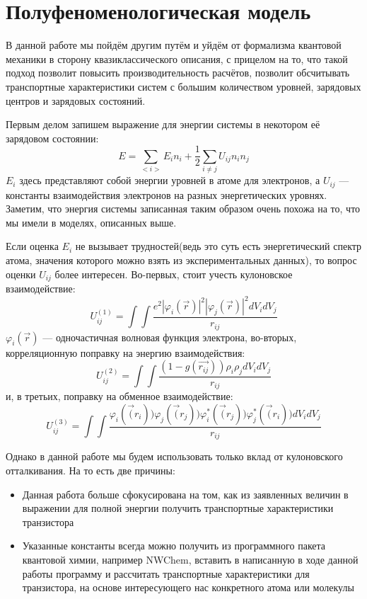 \documentclass[12pt,a4paper]{report}
\begin{document}
\section{Полуфеноменологическая модель}

В данной работе мы пойдём другим путём и уйдём от формализма квантовой механики в сторону квазиклассического описания, с прицелом на то, что такой подход позволит повысить производительность расчётов, позволит обсчитывать транспортные характеристики систем с большим количеством уровней, зарядовых центров и зарядовых состояний.

Первым делом запишем выражение для энергии системы в некотором её зарядовом состоянии:
\begin{equation}\label{phen}
E = \sum\limits_{<i>}E_i n_i + \frac{1}{2} \sum\limits_{i \neq j} U_{ij} n_i n_j
\end{equation}
$E_i$ здесь представляют собой энергии уровней в атоме для электронов, а $U_{ij}$ — константы взаимодействия электронов на разных энергетических уровнях. Заметим, что энергия системы записанная таким образом очень похожа на то, что мы имели в моделях, описанных выше.

Если оценка $E_i$ не вызывает трудностей(ведь это суть есть энергетический спектр атома, значения которого можно взять из экспериментальных данных), то вопрос оценки $U_{ij}$ более интересен. Во-первых, стоит учесть кулоновское взаимодействие:
\begin{equation}
U_{ij}^{(1)} = \int \int \frac{e^2 |\varphi_i(\vec{r})|^2 |\varphi_j(\vec{r})|^2 dV_i dV_j}{r_{ij}}
\end{equation}
$\varphi_i(\vec{r})$ — одночастичная волновая функция электрона, во-вторых, корреляционную поправку на энергию взаимодействия:
\begin{equation}
U_{ij}^{(2)} = \int \int \frac{(1 - g(\vec{r_{ij}})) \rho_i \rho_j dV_i dV_j}{r_{ij}}
\end{equation}
и, в третьих, поправку на обменное взаимодействие:
\begin{equation}
U_{ij}^{(3)} = \int \int \frac{\varphi_i(\vec(r_i)) \varphi_j(\vec(r_j)) \varphi_i^{*}(\vec(r_j))\varphi_j^*(\vec(r_i)) dV_i dV_j}{r_{ij}}
\end{equation}

Однако в данной работе мы будем использовать только вклад от кулоновского отталкивания. На то есть две причины:
\begin{itemize}
\item Данная работа больше сфокусирована на том, как из заявленных величин в выражении для полной энергии получить транспортные характеристики транзистора
\item Указанные константы всегда можно получить из программного пакета квантовой химии, например NWChem, вставить в написанную в ходе данной работы программу и рассчитать транспортные характеристики для транзистора, на основе интересующего нас конкретного атома или молекулы
\end{itemize}
\end{document}
